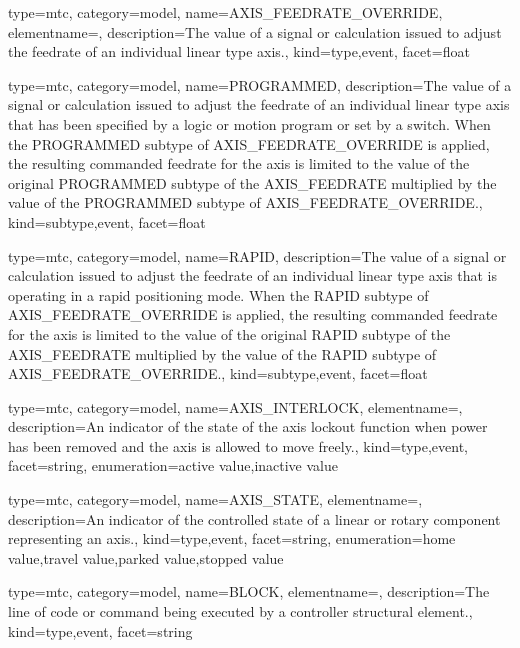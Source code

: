 {
  type=mtc,
  category=model,
  name={AXIS\_FEEDRATE\_OVERRIDE},
  elementname=,
  description={The value of a signal or calculation issued to adjust the feedrate of an individual linear type axis.},
  kind={type,event},
  facet={\gls{float}}
}


{
  type=mtc,
  category=model,
  name={PROGRAMMED},
  description={The value of a signal or calculation issued to adjust the feedrate of an individual linear type axis that has been specified by a logic or motion program or set by a switch. \newline When the PROGRAMMED subtype of AXIS\_FEEDRATE\_OVERRIDE is applied, the resulting commanded feedrate for the axis is limited to the value of the original PROGRAMMED subtype of the AXIS\_FEEDRATE multiplied by the value of the PROGRAMMED subtype of AXIS\_FEEDRATE\_OVERRIDE.},
  kind={subtype,event},
  facet={\gls{float}}
}


{
  type=mtc,
  category=model,
  name={RAPID},
  description={The value of a signal or calculation issued to adjust the feedrate of an individual linear type axis that is operating in a rapid positioning mode. \newline When the RAPID subtype of AXIS\_FEEDRATE\_OVERRIDE is applied, the resulting commanded feedrate for the axis is limited to the value of the original RAPID subtype of the AXIS\_FEEDRATE multiplied by the value of the RAPID subtype of AXIS\_FEEDRATE\_OVERRIDE.},
  kind={subtype,event},
  facet={\gls{float}}
}


{
  type=mtc,
  category=model,
  name={AXIS\_INTERLOCK},
  elementname=,
  description={An indicator of the state of the axis lockout function when power has been removed and the axis is allowed to move freely.},
  kind={type,event},
  facet={\gls{string}},
  enumeration={\gls{active value},\gls{inactive value}}
}


{
  type=mtc,
  category=model,
  name={AXIS\_STATE},
  elementname=,
  description={An indicator of the controlled state of a \gls{linear} or \gls{rotary} component representing an axis.},
  kind={type,event},
  facet={\gls{string}},
  enumeration={\gls{home value},\gls{travel value},\gls{parked value},\gls{stopped value}}
}


{
  type=mtc,
  category=model,
  name={BLOCK},
  elementname=,
  description={The line of code or command being executed by a \gls{controller} \gls{structural element}.},
  kind={type,event},
  facet={\gls{string}}
}


